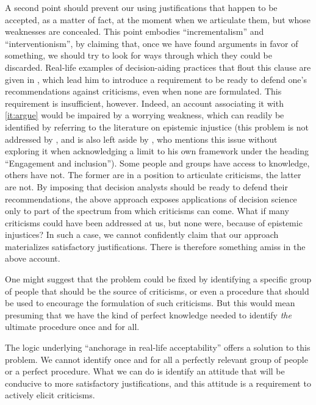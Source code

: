 \documentclass[preprint, french, english, 11pt, authoryear]{elsarticle}%
\begin{document}
A second point should prevent our using justifications that happen to be accepted, as a matter of fact, at the moment when we articulate them, but whose weaknesses are concealed. 
This point embodies “incrementalism” and ``interventionism'', by claiming that, once we have found arguments in favor of something, we should try to look for ways through which they could be discarded. 
Real-life examples of decision-aiding practices that flout this clause are given in \cite{meinard_what_2017}, which lead him to introduce a requirement to be ready to defend one's recommendations against criticisms, even when none are formulated. 
This requirement is insufficient, however. Indeed, an account associating it with \cref{it:argue} would be impaired by a worrying weakness, which can readily be identified by referring to the literature on epistemic injustice \citep{fricker_epistemic_2007} 
(this problem is not addressed by \cite{meinard_what_2017}, and is also left aside by \cite{mingers_ethics_2011}, who mentions this issue without exploring it when acknowledging a limit to his own framework under the heading ``Engagement and inclusion''). 
Some people and groups have access to knowledge, others have not. The former are in a position to articulate criticisms, the latter are not. 
By imposing that decision analysts should be ready to defend their recommendations, the above approach exposes applications of decision science only to part of the spectrum from which criticisms can come. 
What if many criticisms could have been addressed at us, but none were, because of epistemic injustices? In such a case, we cannot confidently claim that our approach materializes satisfactory justifications. There is therefore something amiss in the above account.

One might suggest that the problem could be fixed by identifying a specific group of people that should be the source of criticisms, or even a procedure that should be used to encourage the formulation of such criticisms. 
But this would mean presuming that we have the kind of perfect knowledge needed to identify \emph{the} ultimate procedure once and for all.

The logic underlying ``anchorage in real-life acceptability” offers a solution to this problem. We cannot identify once and for all a perfectly relevant group of people or a perfect procedure. 
What we can do is identify an attitude that will be conducive to more satisfactory justifications, and this attitude is a requirement to actively elicit criticisms.
\end{document}
